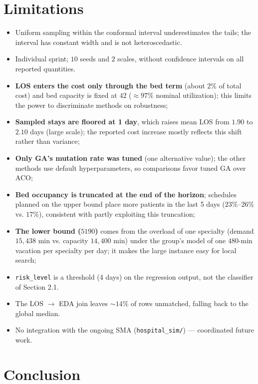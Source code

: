 \documentclass[11pt,a4paper]{article}
\begin{document}
\section{Limitations}
\begin{itemize}[nosep]
  \item Uniform sampling within the conformal interval underestimates the tails; the interval has constant width and is not heteroscedastic.
  \item Individual sprint; \(10\) seeds and \(2\) scales, without confidence intervals on all reported quantities.
  \item \textbf{LOS enters the cost only through the bed term} (about \(2\%\) of total cost) and bed capacity is fixed at \(42\) (\(\approx 97\%\) nominal utilization); this limits the power to discriminate methods on robustness; 
  \item \textbf{Sampled stays are floored at 1 day}, which raises mean LOS from \(1.90\) to \(2.10\) days (large scale); the reported cost increase mostly reflects this shift rather than variance; 
  \item \textbf{Only GA's mutation rate was tuned} (one alternative value); the other methods use default hyperparameters, so comparisons favor tuned GA over ACO; 
  \item \textbf{Bed occupancy is truncated at the end of the horizon}; schedules planned on the upper bound place more patients in the last 5 days (\(23\%\)--\(26\%\) vs. \(17\%\)), consistent with partly exploiting this truncation; 
  \item \textbf{The lower bound (\(5190\))} comes from the overload of one specialty (demand \(15{,}438\) min vs. capacity \(14{,}400\) min) under the group's model of one \(480\)-min vacation per specialty per day; it makes the large instance easy for local search;
  \item \texttt{risk\_level} is a threshold (4 days) on the regression output, not the classifier of Section 2.1. 
  \item The LOS \(\to\) EDA join leaves \(\sim 14\%\) of rows unmatched, falling back to the global median.
  \item No integration with the ongoing SMA (\texttt{hospital\_sim/}) --- coordinated future work.
\end{itemize}

\section{Conclusion}
\end{document}
